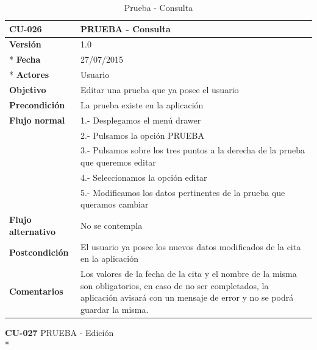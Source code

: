 \documentclass[../pfc.tex]{subfiles}
\begin{document}
	\begin{table}[H]
		\centering
		\begin{tabular}[t]{|p{3cm}|p{9.5cm}|}
			\hline \textbf{CU-026} & \textbf{PRUEBA - Consulta} \\*
			\hline\hline \textbf{Versión} & 1.0 \\ *
			\hline\hline \textbf{Fecha} & 27/07/2015 \\ *
			\hline\textbf{Actores} 	& Usuario\\*
			\hline \textbf{Objetivo} & Editar una prueba que ya posee el usuario\\* 			
			\hline \textbf{Precondición} & La prueba existe en la aplicación\\* 
			\hline \textbf{Flujo normal} & 1.- Desplegamos el menú drawer \\* 
			& 2.- Pulsamos la opción PRUEBA\\*	
			& 3.- Pulsamos sobre los tres puntos a la derecha de la prueba que queremos editar\\*	
			& 4.- Seleccionamos la opción editar\\*	
			& 5.- Modificamos los datos pertinentes de la prueba que queramos cambiar\\*	
			\hline \textbf{Flujo alternativo} & No se contempla \\* 
			\hline \textbf{Postcondición} & El usuario ya posee los nuevos datos modificados de la cita en la aplicación \\* 
			\hline \textbf{Comentarios}   & Los valores de la fecha de la cita y el nombre de la misma son obligatorios, en caso de no ser completados, la aplicación avisará con un mensaje de error y no se podrá guardar la misma.\\*
			\hline
		\end{tabular}
		\caption{Prueba - Consulta}
		\label{tabla:caso026}
	\end{table}
	
	\textbf{CU-027}	PRUEBA - Edición\\*
	
\end{document}
